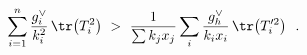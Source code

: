 \begin{equation}\label{estimate}
\sum_{i=1}^{n} \frac{g^{\vee}_{i}}{k_{i}^{2}}\, \tr \bigl(T_{i}^{2}\bigr)\ >\
\frac{1}{\sum k_{j }x_{j}}\sum_{i}\frac{g_{h}^{\vee }}{k_{i}x_{i}}\, \tr
\bigl( T_{i}'^{2}\bigr) \ \ . 
\end{equation}

